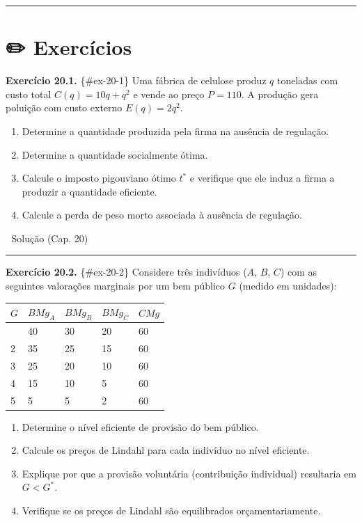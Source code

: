 \documentclass[11pt,twoside,openright]{book}
\providecommand{\tightlist}{\setlength{\itemsep}{0pt}\setlength{\parskip}{0pt}}
\begin{document}
\begin{center}\rule{0.5\linewidth}{0.5pt}\end{center}

\section{✏️ Exercícios}\label{exercuxedcios-2}

\textbf{Exercício 20.1.} \{\#ex-20-1\} Uma fábrica de celulose produz
\(q\) toneladas com custo total \(C(q) = 10q + q^2\) e vende ao preço
\(P = 110\). A produção gera poluição com custo externo \(E(q) = 2q^2\).

\begin{enumerate}
\def\labelenumi{(\alph{enumi})}
\tightlist
\item
  Determine a quantidade produzida pela firma na ausência de regulação.
\item
  Determine a quantidade socialmente ótima.
\item
  Calcule o imposto pigouviano ótimo \(t^*\) e verifique que ele induz a
  firma a produzir a quantidade eficiente.
\item
  Calcule a perda de peso morto associada à ausência de regulação.
\end{enumerate}

🔑 Solução (Cap. 20)

\begin{center}\rule{0.5\linewidth}{0.5pt}\end{center}

\textbf{Exercício 20.2.} \{\#ex-20-2\} Considere três indivíduos (\(A\),
\(B\), \(C\)) com as seguintes valorações marginais por um bem público
\(G\) (medido em unidades):

{\def\LTcaptype{none} %
\begin{longtable}[]{@{}lllll@{}}
\toprule\noalign{}
\(G\) & \(BMg_A\) & \(BMg_B\) & \(BMg_C\) & \(CMg\) \\
\midrule\noalign{}
\endhead
\bottomrule\noalign{}
\endlastfoot
1 & 40 & 30 & 20 & 60 \\
2 & 35 & 25 & 15 & 60 \\
3 & 25 & 20 & 10 & 60 \\
4 & 15 & 10 & 5 & 60 \\
5 & 5 & 5 & 2 & 60 \\
\end{longtable}
}

\begin{enumerate}
\def\labelenumi{(\alph{enumi})}
\tightlist
\item
  Determine o nível eficiente de provisão do bem público.
\item
  Calcule os preços de Lindahl para cada indivíduo no nível eficiente.
\item
  Explique por que a provisão voluntária (contribuição individual)
  resultaria em \(G < G^*\).
\item
  Verifique se os preços de Lindahl são equilibrados orçamentariamente.
\end{enumerate}
\end{document}
